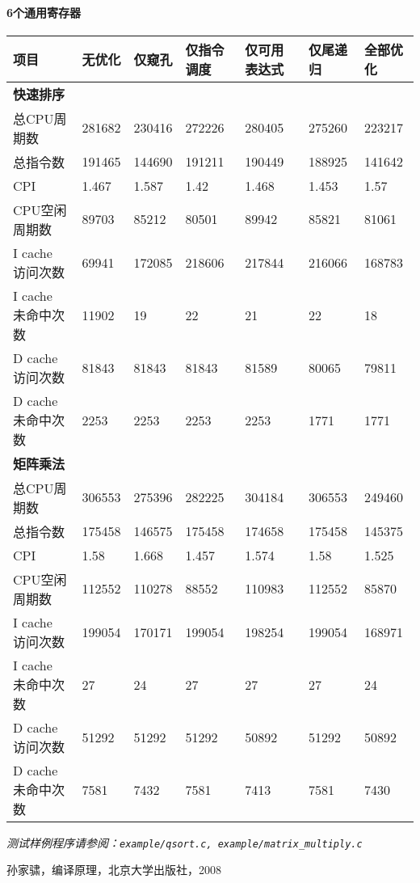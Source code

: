 \paragraph*{6个通用寄存器}
\begin{center}
	\begin{tabular}{lllllll}
\hline
项目 & 无优化 & 仅窥孔 & 仅指令调度 & 仅可用表达式 & 仅尾递归 & 全部优化\\
\hline
\textbf{快速排序} &  &  &  &  &  & \\
总CPU周期数 & 281682 & 230416 & 272226 & 280405 & 275260 & 223217\\
总指令数 & 191465 & 144690 & 191211 & 190449 & 188925 & 141642\\
CPI & 1.467 & 1.587 & 1.42 & 1.468 & 1.453 & 1.57\\
CPU空闲周期数 & 89703 & 85212 & 80501 & 89942 & 85821 & 81061\\
I cache 访问次数  & 69941 & 172085 & 218606 & 217844 & 216066 & 168783\\
I cache 未命中次数 & 11902 & 19 & 22 & 21 & 22 & 18\\
D cache 访问次数 & 81843 & 81843 & 81843 & 81589 & 80065 & 79811\\
D cache 未命中次数 & 2253 & 2253 & 2253 & 2253 & 1771 & 1771\\
\hline
\hline
\textbf{矩阵乘法} &  &  &  &  &  &\\ 
总CPU周期数 & 306553 & 275396 & 282225 & 304184 & 306553 & 249460\\
总指令数 & 175458 & 146575 & 175458 & 174658 & 175458 & 145375\\
CPI & 1.58 & 1.668 & 1.457 & 1.574 & 1.58 & 1.525\\
CPU空闲周期数 & 112552 & 110278 & 88552 & 110983 & 112552 & 85870\\
I cache 访问次数  & 199054 & 170171 & 199054 & 198254 & 199054 & 168971\\
I cache 未命中次数 & 27 & 24 & 27 & 27 & 27 & 24\\
D cache 访问次数 & 51292 & 51292 & 51292 & 50892 & 51292 & 50892\\
D cache 未命中次数 & 7581 & 7432 & 7581 & 7413 & 7581 & 7430\\
\hline
\hline
	\end{tabular}
\end{center}
{\it \anchor 测试样例程序请参阅：\verb|example/qsort.c, example/matrix_multiply.c|}\\
\begin{thebibliography}{99}
孙家骕，编译原理，北京大学出版社，2008
\end{thebibliography}

